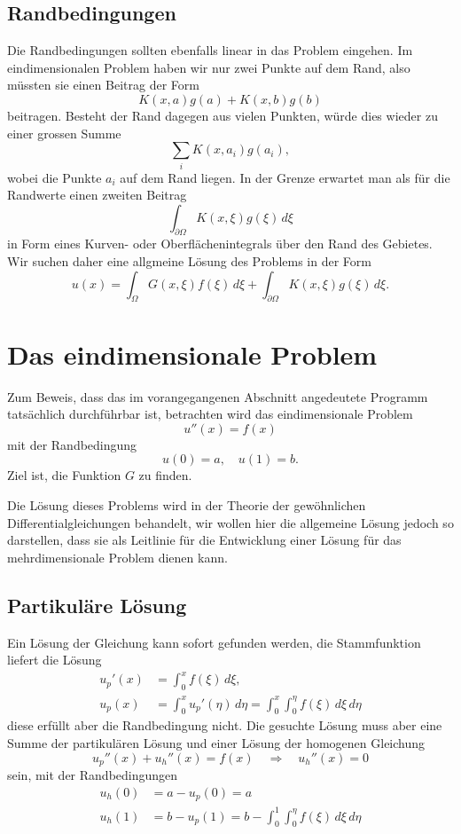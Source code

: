 \subsection{Randbedingungen}
Die Randbedingungen sollten ebenfalls linear in das Problem eingehen.
Im eindimensionalen Problem haben wir nur zwei Punkte auf dem Rand,
also müssten sie einen Beitrag der Form
\[
K(x,a) g(a) + K(x,b)g(b)
\]
beitragen. Besteht der Rand dagegen aus vielen Punkten, würde dies
wieder zu einer grossen Summe
\[
\sum_{i}K(x,a_i)g(a_i),
\]
wobei die Punkte $a_i$ auf dem Rand liegen. In der Grenze erwartet man
als für die Randwerte einen zweiten Beitrag
\[
\int_{\partial\Omega}K(x,\xi)g(\xi)\,d\xi
\]
in Form eines Kurven- oder Oberflächenintegrals über den Rand des
Gebietes.
Wir suchen daher eine allgmeine Lösung des Problems in der Form
\begin{equation}
u(x)=\int_{\Omega} G(x,\xi)f(\xi)\,d\xi + \int_{\partial\Omega} K(x,\xi)g(\xi)\,d\xi.
\label{greenformula}
\end{equation}

\section{Das eindimensionale Problem}
Zum Beweis, dass das im vorangegangenen Abschnitt angedeutete Programm 
tatsächlich durchführbar ist,
betrachten wird das eindimensionale Problem
\[
u''(x)=f(x)
\]
mit der Randbedingung
\[
u(0)=a,\quad u(1)=b.
\]
Ziel ist, die Funktion $G$ zu finden.

Die Lösung dieses Problems wird in der Theorie der gewöhnlichen
Differential\-gleichungen behandelt, wir wollen hier die allgemeine
Lösung jedoch so darstellen, dass sie als Leitlinie für die
Entwicklung einer Lösung für das mehrdimensionale Problem dienen
kann.
\subsection{Partikuläre Lösung}
Ein Lösung der Gleichung kann sofort gefunden werden, die Stammfunktion
liefert die Lösung
\begin{align*}
u_p'(x)&=\int_0^xf(\xi)\,d\xi,
\\
u_p(x)&=\int_0^xu_p'(\eta)\,d\eta=\int_0^x\int_0^\eta f(\xi)\,d\xi\,d\eta
\end{align*}
diese erfüllt aber die Randbedingung nicht.
Die gesuchte Lösung muss aber eine Summe der partikulären Lösung 
und einer Lösung der homogenen Gleichung
\[
u_p''(x) + u_h''(x)=f(x)\quad\Rightarrow\quad u_h''(x)=0
\]
sein, mit der Randbedingungen
\begin{align*}
u_h(0)&=a-u_p(0)=a\\
u_h(1)&=b-u_p(1)=b-\int_0^1\int_0^\eta f(\xi)\,d\xi\,d\eta
\end{align*}

